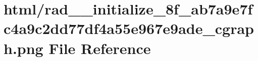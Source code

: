 \hypertarget{rad____initialize__8f__ab7a9e7fc4a9c2dd77df4a55e967e9ade__cgraph_8png}{}\section{html/rad\+\_\+\+\_\+initialize\+\_\+8f\+\_\+ab7a9e7fc4a9c2dd77df4a55e967e9ade\+\_\+cgraph.png File Reference}
\label{rad____initialize__8f__ab7a9e7fc4a9c2dd77df4a55e967e9ade__cgraph_8png}
